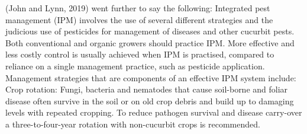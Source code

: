 (John and Lynn, 2019) went further to say the following: 
Integrated pest management (IPM) involves the use of several different strategies and the judicious use of pesticides for management of diseases and other cucurbit pests. Both conventional and organic growers should practice IPM. More effective and less costly control is usually achieved when IPM is practised, compared to reliance on a single management practice, such as pesticide application. Management strategies that are components of an effective IPM system include: 
Crop rotation: Fungi, bacteria and nematodes that cause soil-borne and foliar disease often survive in the soil or on old crop debris and build up to damaging levels with repeated cropping. To reduce pathogen survival and disease carry-over a three-to-four-year rotation with non-cucurbit crops is recommended. 

